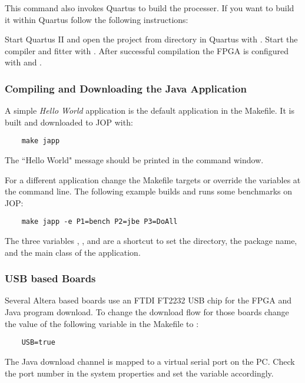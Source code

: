 This command also invokes Quartus to build the processer. If you
want to build it within Quartus follow the following instructions:

\label{subsubsec:quartus}

Start Quartus II and open the project  from directory
 in Quartus with . Start the compiler and fitter with . After successful compilation the FPGA is
configured with  and .

\subsubsection{Compiling and Downloading the Java Application}

A simple \emph{Hello World} application is the default application
in the Makefile. It is built and downloaded to JOP with:

\begin{verbatim}
    make japp
\end{verbatim}

The ``Hello World" message should be printed in the command window.

For a different application change the Makefile targets or override
the  variables at the command line. The following example
builds and runs some benchmarks on JOP:

\begin{verbatim}
    make japp -e P1=bench P2=jbe P3=DoAll
\end{verbatim}

The three variables , , and  are a
shortcut to set the directory, the package name, and the main class
of the application.

\subsubsection{USB based Boards}

Several Altera based boards use an FTDI FT2232 USB chip for the FPGA
and Java program download. To change the download flow for those
boards change the value of the following variable in the Makefile to
:

\begin{verbatim}
    USB=true
\end{verbatim}

The Java download channel is mapped to a virtual serial port on the
PC. Check the port number in the system properties and set the
variable  accordingly.

